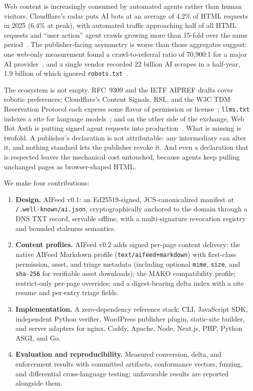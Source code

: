 \documentclass[11pt]{article}
\newcommand{\aifeed}{AIFeed}
\newcommand{\aimd}{AIFeed Markdown}
\newcommand{\mako}{MAKO}
\newcommand{\code}[1]{\texttt{#1}}
\begin{document}
Web content is increasingly consumed by automated agents rather than human visitors.
Cloudflare's radar puts AI bots at an average of 4.2\% of HTML requests in 2025 (6.4\% at
peak), with automated traffic approaching half of all HTML requests and ``user action''
agent crawls growing more than 15-fold over the same period~\citep{cfRadar2025}. The
publisher-facing asymmetry is worse than those aggregates suggest: one web-only
measurement found a crawl-to-referral ratio of 70{,}900:1 for a major AI
provider~\citep{cfCrawlRefer}, and a single vendor recorded 22 billion AI scrapes in a
half-year, 1.9 billion of which ignored \code{robots.txt}~\citep{tollbit}.

The ecosystem is not empty. RFC~9309 and the IETF AIPREF drafts cover robotic preferences;
Cloudflare's Content Signals, RSL, and the W3C TDM Reservation Protocol each express some
flavor of permission or license~\citep{rfc9309,draftAiprefVocab,draftAiprefAttach,cfContentSignals,rsl,tdmrep};
\code{llms.txt} indexes a site for language models~\citep{llmstxt}; and on the other side
of the exchange, Web Bot Auth is putting signed agent requests into
production~\citep{draftWebbotauth,cfBotPrinciples}. What is missing is twofold. A
publisher's declaration is not attributable: any intermediary can alter it, and nothing
standard lets the publisher revoke it. And even a declaration that is respected leaves the
mechanical cost untouched, because agents keep pulling unchanged pages as browser-shaped
HTML.

We make four contributions:

\begin{enumerate}
  \item \textbf{Design.} \aifeed{} v0.1: an Ed25519-signed, JCS-canonicalized manifest at
  \code{/.well-known/ai.json}, cryptographically anchored to the domain through a DNS TXT
  record, servable offline, with a multi-signature revocation registry and bounded
  staleness semantics.
  \item \textbf{Content profiles.} \aifeed{} v0.2 adds signed per-page content delivery:
  the native \aimd{} profile (\code{text/aifeed+markdown}) with first-class permission,
  asset, and triage metadata (including optional \code{mime}, \code{size}, and
  \code{sha-256} for verifiable asset downloads); the \mako{} compatibility profile;
  restrict-only per-page overrides; and a digest-bearing delta index with a site resume
  and per-entry triage fields.
  \item \textbf{Implementation.} A zero-dependency reference stack: CLI, JavaScript SDK,
  independent Python verifier, WordPress publisher plugin, static-site builder, and
  server adapters for nginx, Caddy, Apache, Node, Next.js, PHP, Python ASGI, and Go.
  \item \textbf{Evaluation and reproducibility.} Measured conversion, delta, and
  enforcement results with committed artifacts, conformance vectors, fuzzing, and
  differential cross-language testing; unfavorable results are reported alongside them.
\end{enumerate}
\end{document}
